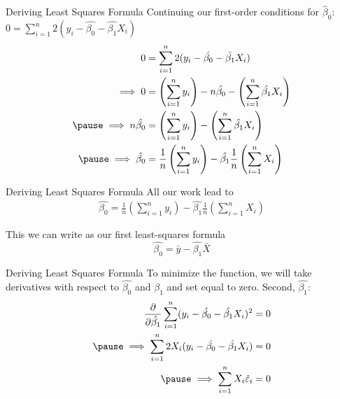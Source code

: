 \documentclass[aspectratio=169,t,11pt,table]{beamer}
\begin{document}
\begin{frame}{Deriving Least Squares Formula}
  Continuing our first-order conditions for $\hat{\beta}_0$: $0 = \sum_{i=1}^n 2 (y_i - \hat{\beta_0} - \hat{\beta_1} X_i)$
  \begin{align*}
    0 &= \sum_{i=1}^n 2 (y_i - \hat{\beta_0} - \hat{\beta_1} X_i) \\
    \implies 0 &= \left(\sum_{i=1}^n y_i \right) - n \hat{\beta_0} - \left( \sum_{i=1}^n \hat{\beta_1} X_i \right) \\ 
    \pause
    \implies n \hat{\beta_0} &= \left(\sum_{i=1}^n y_i \right) - \left( \sum_{i=1}^n \hat{\beta_1} X_i \right) \\ 
    \pause
    \implies \hat{\beta_0} &= \frac{1}{n} \left(\sum_{i=1}^n y_i \right) - \hat{\beta_1} \frac{1}{n} \left( \sum_{i=1}^n X_i \right) \\ 
  \end{align*}
\end{frame}

\begin{frame}{Deriving Least Squares Formula}
  All our work lead to
  \begin{align*}
    \hat{\beta_0} = \frac{1}{n} \left(\sum_{i=1}^n y_i \right) - \hat{\beta_1} \frac{1}{n} \left( \sum_{i=1}^n X_i \right) 
  \end{align*}  

  \bigskip 
  This we can write as our first least-squares formula
  $$\hat{\beta_0} = \bar{y} - \hat{\beta_1} \bar{X}$$
\end{frame}


\begin{frame}{Deriving Least Squares Formula}
  To minimize the function, we will take derivatives with respect to $\hat{\beta_0}$ and $\hat{\beta_1}$ and set equal to zero. Second, $\hat{\beta_1}$:
  \begin{align*}
    \frac{\partial}{\partial \hat{\beta_1}} \sum_{i=1}^n (y_i - \hat{\beta_0} - \hat{\beta_1} X_i)^2 &= 0 \\
    \pause
    \implies \sum_{i=1}^n 2 X_i (y_i - \hat{\beta_0} - \hat{\beta_1} X_i) &= 0 \\
    \pause
    \implies \sum_{i=1}^n X_i \hat{\varepsilon}_i &= 0
  \end{align*}
\end{frame}
\end{document}
